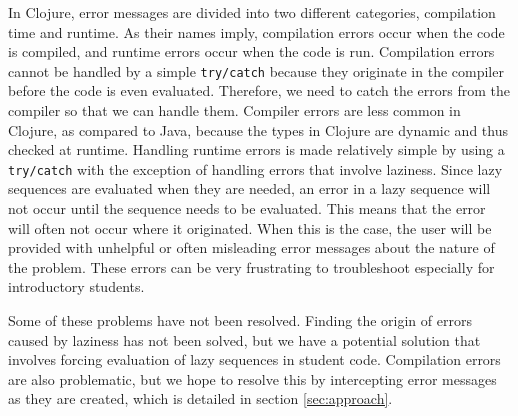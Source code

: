 \documentclass[12pt]{article}
\newcommand{\comment}[1]{{\bf \tt  {#1}}}
\newcommand{\emcomment}[1]{\textcolor{ForestGreen}{\comment{Elena: {#1}}}}
\begin{document}
In Clojure, error messages are divided into two different categories, compilation time and runtime. As their names imply, compilation errors occur when the code is compiled, and runtime errors occur when the code is run.
Compilation errors cannot be handled by a simple {\tt try/catch} because they originate in the compiler before the code is even evaluated. Therefore, we need to catch the errors from the compiler so that we can handle them. Compiler errors are less common in Clojure, as compared to Java, because the types in Clojure are dynamic and thus checked at runtime.
Handling runtime errors is made relatively simple by using a {\tt try/catch}  with the exception of handling errors that involve laziness. Since lazy sequences are evaluated when they are needed, an error in a lazy sequence will not occur until the sequence needs to be evaluated. This means that the error will often not occur where it originated. When this is the case, the user will be provided with unhelpful or often misleading error messages about the nature of the problem. These errors can be very frustrating to troubleshoot especially for introductory students. %

Some of these problems have not been resolved. Finding the origin of errors caused by laziness has not been solved, but we have a potential solution that involves forcing evaluation of lazy sequences in student code. Compilation errors are also problematic, but we hope to resolve this by intercepting error messages as they are created, which is detailed in section \ref{sec:approach}.


 
\end{document}
